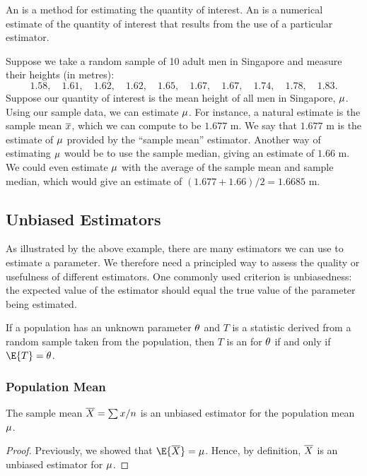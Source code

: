 \begin{definition}
    An  is a method for estimating the quantity of interest. An  is a numerical estimate of the quantity of interest that results from the use of a particular estimator.
\end{definition}

\begin{example}[Estimator]
    Suppose we take a random sample of 10 adult men in Singapore and measure their heights (in metres): \[1.58, \quad 1.61, \quad 1.62, \quad 1.62, \quad 1.65, \quad 1.67, \quad 1.67, \quad 1.74, \quad 1.78, \quad 1.83.\] Suppose our quantity of interest is the mean height of all men in Singapore, $\mu$. Using our sample data, we can estimate $\mu$. For instance, a natural estimate is the sample mean $\overline{x}$, which we can compute to be $1.677$ m. We say that $1.677$ m is the estimate of $\mu$ provided by the ``sample mean'' estimator. Another way of estimating $\mu$ would be to use the sample median, giving an estimate of $1.66$ m. We could even estimate $\mu$ with the average of the sample mean and sample median, which would give an estimate of $(1.677 + 1.66)/2 = 1.6685$ m.
\end{example}

\subsection{Unbiased Estimators}

As illustrated by the above example, there are many estimators we can use to estimate a parameter. We therefore need a principled way to assess the quality or usefulness of different estimators. One commonly used criterion is unbiasedness: the expected value of the estimator should equal the true value of the parameter being estimated.

\begin{definition}
    If a population has an unknown parameter $\theta$ and $T$ is a statistic derived from a random sample taken from the population, then $T$ is an  for $\theta$ if and only if $\E{T} = \t$.
\end{definition}

\subsubsection{Population Mean}

\begin{proposition}
    The sample mean $\overline{X} = \sum x/n$ is an unbiased estimator for the population mean $\mu$.
\end{proposition}
\begin{proof}
    Previously, we showed that $\E{\ol{X}} = \m$. Hence, by definition, $\overline{X}$ is an unbiased estimator for $\mu$.
\end{proof}

